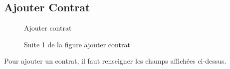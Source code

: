 \documentclass[a4paper]{report}
\begin{document}
\begin{doublespace}
	\subsection{Ajouter Contrat}
	\begin{figure}[H]
		\begin{center}
			\caption{Ajouter contrat}
		\end{center}
	\end{figure}
	\begin{figure}[H]
		\begin{center}
			\caption{Suite 1 de la figure ajouter contrat}
		\end{center}
	\end{figure}
	Pour ajouter un contrat, il faut renseigner les champs affichées ci-dessus.
	\begin{figure}[H]
		\begin{center}

\end{center}
\end{figure}
\end{doublespace}
\end{document}
